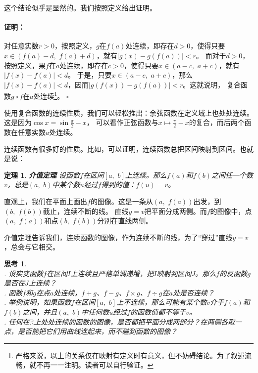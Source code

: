 \documentclass[12pt,UTF8]{ctexbook}
\newtheorem{tm}{定理}[section]
\newtheorem{sk}{思考}[section]
\renewenvironment{proof}{\paragraph{\textbf{证明：}}}{\hfill$\square$}
\begin{document}
这个结论似乎是显然的。我们按照定义给出证明。
\begin{proof}
    对任意实数$r>0$，按照定义，$g$在$f(a)$处连续，即存在$d>0$，使得只要$x\in(f(a)-d,\,\,f(a)+d)$，就有$|g(x) - g(f(a))| < r$。
    而对于$d>0$，按照定义，果$f$在$a$处连续，即存在$c>0$，使得只要$x\in(a-c,\,\,a+c)$，就有$|f(x) - f(a)| < d$。
    于是，只要$x\in(a-c,\,\,a+c)$，那么$|f(x) - f(a)| < d$，因而$|g(f(x)) - g(f(a))| < r$。这就说明，
    复合函数$g\circ f$在$a$处连续\footnote{严格来说，以上的关系仅在映射有定义时有意义，但不妨碍结论。为了叙述流畅，就不再一一注明。读者可以自行验证。}。
\end{proof}

使用复合函数的连续性质，我们可以轻松推出：余弦函数在定义域上也处处连续。这是因为$\cos{x} = \sin{\frac{\pi}{2} - x}$，
可以看作正弦函数与$x\mapsto \frac{\pi}{2} - x$的复合，而后两个函数在任意实数$a$处连续。

连续函数有很多好的性质。比如，可以证明，连续函数总把区间映射到区间。也就是说：
\begin{tm}{\textbf{介值定理}}
    设函数$f$在区间$[a, \,\,b]$上连续。那么$f(a)$和$f(b)$之间任一个数$v$，总是$(a, \,\,b)$中某个数$u$经过$f$得到的值：$f(u) = v$。
\end{tm}

直观上，我们在平面上画出$f$的图像。这是一条从$(a,\,\,f(a))$出发，到$(b,\,\,f(b))$截止，连续不断的线。
直线$y = v$把平面分成两侧。而$f$的图像中，点$(a,\,\,f(a))$和点$(b,\,\,f(b))$分别在直线两侧。

介值定理告诉我们，连续函数的图像，作为连续不断的线，为了“穿过”直线$y = v$，总会与它相交。

\begin{sk}
    \mbox{} \\
    . 设实变函数$f$在区间$I$上连续且严格单调递增，把$I$映射到区间$J$。那么$f$的反函数$g$是否在$J$上连续？\\
    . 函数$f$和$g$在点$a$处连续，$f + g$、$f - g$、$f \times g$、$f \div g$在$a$处是否连续？\\
    . 举例说明，如果函数$f$在区间$[a,\,\,b]$上不连续，那么可能有某个数$v$介于$f(a)$和$f(b)$之间，并且$(a,\,\,b)$中任何数$u$经过$f$的函数值都不等于$v$。\\
    . 任何在$\mathbb{R}$上处处连续的函数的图像，是否都把平面分成两部分？在两侧各取一点，是否能把它们用曲线连起来，而不碰到函数的图像？\\
\end{sk}
\end{document}
